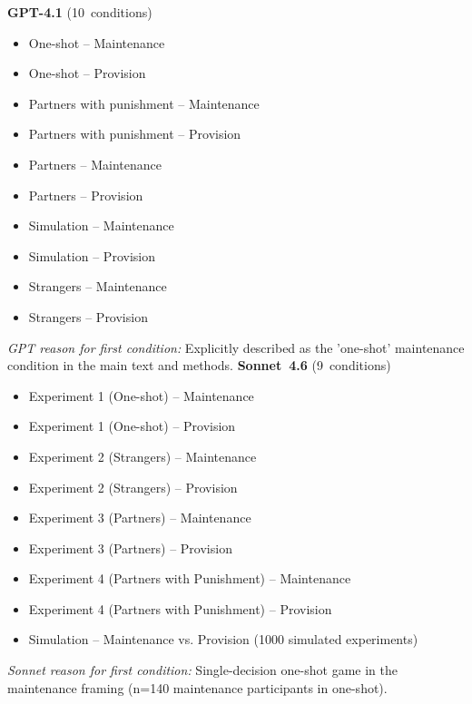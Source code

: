 \documentclass[11pt,a4paper]{article}
\begin{document}
              \begin{tcolorbox}[
            title={\textbf{Case 3 — GPT has more conditions (gpt\textbackslash{}\_splits\textbackslash{}\_sonnet)} (name-match 100\%) --- DOI: 10.1038\_s41562-017-0191-5},
            colback=teal!4!white, colframe=teal!55!black,
            fonttitle=\small\sffamily,
            sidebyside, sidebyside align=top seam,
            lower separated=false, breakable,
            before upper={\small}, before lower={\small},
          ]
          \textbf{GPT-4.1} (10~conditions)\\[4pt]
          \begin{itemize}[leftmargin=*,noitemsep,topsep=0pt]
            \item One-shot – Maintenance
\item One-shot – Provision
\item Partners with punishment – Maintenance
\item Partners with punishment – Provision
\item Partners – Maintenance
\item Partners – Provision
\item Simulation – Maintenance
\item Simulation – Provision
\item Strangers – Maintenance
\item Strangers – Provision
          \end{itemize}
          \medskip\textit{GPT reason for first condition:} Explicitly described as the 'one-shot' maintenance condition in the main text and methods.
          \tcblower
          \textbf{Sonnet~4.6} (9~conditions)\\[4pt]
          \begin{itemize}[leftmargin=*,noitemsep,topsep=0pt]
            \item Experiment 1 (One-shot) – Maintenance
\item Experiment 1 (One-shot) – Provision
\item Experiment 2 (Strangers) – Maintenance
\item Experiment 2 (Strangers) – Provision
\item Experiment 3 (Partners) – Maintenance
\item Experiment 3 (Partners) – Provision
\item Experiment 4 (Partners with Punishment) – Maintenance
\item Experiment 4 (Partners with Punishment) – Provision
\item Simulation – Maintenance vs. Provision (1000 simulated experiments)
          \end{itemize}
          \medskip\textit{Sonnet reason for first condition:} Single-decision one-shot game in the maintenance framing (n=140 maintenance participants in one-shot).
          \end{tcolorbox}
\end{document}
